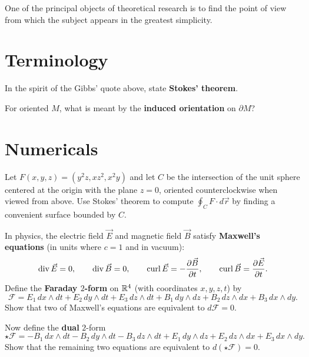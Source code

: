 \documentclass{homework}
\author{Jim Fowler}
\begin{document}
\maketitle

\begin{inspiration}
One of the principal objects of theoretical research is to find the point of view from which the subject appears in the greatest simplicity.
\end{inspiration}

\section{Terminology}

\begin{problem}\label{stokes-statement}%
  In the spirit of the Gibbs' quote above, state \textbf{Stokes' theorem}.
\end{problem}

\begin{problem}\label{orientation-of-boundary}%
  For oriented $M$, what is meant by the \textbf{induced orientation} on $\partial M$?
\end{problem}

\section{Numericals}

\begin{problem}
  Let $F(x,y,z) = (y^2 z, xz^2, x^2 y)$ and let $C$ be the intersection of the unit sphere centered at the origin with the plane $z = 0$, oriented counterclockwise when viewed from above.
  Use Stokes' theorem to compute $\displaystyle\oint_C F \cdot d\vec{r}$ by finding a convenient surface bounded by $C$.
\end{problem}

\begin{problem}\label{maxwell}%
  In physics, the electric field $\vec{E}$ and magnetic field $\vec{B}$ satisfy \textbf{Maxwell's equations} (in units where $c=1$ and in vacuum):
  \[
    \operatorname{div} \vec{E} = 0, \qquad \operatorname{div} \vec{B} = 0, \qquad \operatorname{curl} \vec{E} = -\frac{\partial \vec{B}}{\partial t}, \qquad \operatorname{curl} \vec{B} = \frac{\partial \vec{E}}{\partial t}.
  \]
  Define the \textbf{Faraday $2$-form} on $\mathbb{R}^4$ (with coordinates $x,y,z,t$) by
  \[
    \mathcal{F} = E_1\,dx\wedge dt + E_2\,dy\wedge dt + E_3\,dz\wedge dt + B_1\,dy\wedge dz + B_2\,dz\wedge dx + B_3\,dx\wedge dy.
  \]
  Show that two of Maxwell's equations are equivalent to $d\mathcal{F} = 0$.

  Now define the \textbf{dual} $2$-form
  \[
    \star\mathcal{F} = -B_1\,dx\wedge dt - B_2\,dy\wedge dt - B_3\,dz\wedge dt + E_1\,dy\wedge dz + E_2\,dz\wedge dx + E_3\,dx\wedge dy.
  \]
  Show that the remaining two equations are equivalent to $d(\star\mathcal{F}) = 0$.
\end{problem}
\end{document}

